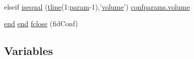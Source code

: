 \begin{DoxyCompactItemize}
$$\item 
elseif \hyperlink{a00028_ab95e741dbc04dc8030ed60d7b15454a1}{isequal} (\hyperlink{a00033_a6791897869706b835f1a5d305739a415}{tline}(1\-:\hyperlink{a00033_a51f20d6b1b54a2eee3be0e8adc96a0ae}{param}-\/1),'\hyperlink{a00071_a9bc498ccac8db41438f855f5dd3f4c05}{volume}') \hyperlink{a00071_a9bc498ccac8db41438f855f5dd3f4c05}{confparams.\-volume}
\item 
\hyperlink{a00025_afb358f48b1646c750fb9da6c6585be2b}{end} \hyperlink{a00025_afb358f48b1646c750fb9da6c6585be2b}{end} \hyperlink{a00028_a66a54a4db5a27a03991b5f3034bbc6a4}{fclose} (fid\-Conf)
\end{DoxyCompactItemize}
\subsection*{Variables}
